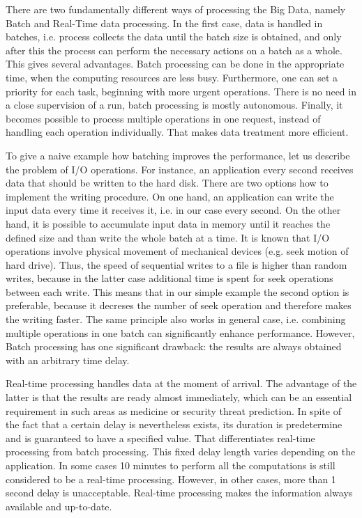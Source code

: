 There are two fundamentally different ways of processing the Big Data, namely Batch and Real-Time data processing.
In the first case, data is handled in batches, i.e. process collects the data until the batch size is obtained, and only after this the process can perform the necessary actions on a batch as a whole.
This gives several advantages.
Batch processing can be done in the appropriate time, when the computing resources are less busy.
Furthermore, one can set a priority for each task, beginning with more urgent operations.
There is no need in a close supervision of a run, batch processing is mostly autonomous.
Finally, it becomes possible to process multiple operations in one request, instead of handling each operation individually.
That makes data treatment more efficient. 

To give a naive example how batching improves the performance, let us describe the problem of I/O operations.
For instance, an application every second receives data that should be written to the hard disk. 
There are two options how to implement the writing procedure.
On one hand, an application can write the input data every time it receives it, i.e. in our case every second.
On the other hand, it is possible to accumulate input data in memory until it reaches the defined size and than write the whole batch at a time.
It is known that I/O operations involve physical movement of mechanical devices (e.g. seek motion of hard drive).
Thus, the speed of sequential writes to a file is higher than random writes, because in the latter case additional time is spent for seek operations between each write.
This means that in our simple example the second option is preferable, because it decreses the number of seek operation and therefore makes the writing faster.    
The same principle also works in general case, i.e. combining multiple operations in one batch can significantly enhance performance.
However, Batch processing has one significant drawback: the results are always obtained with an arbitrary time delay.

Real-time processing handles data at the moment of arrival. 
The advantage of the latter is that the results are ready almost immediately, which can be an essential requirement in such areas as medicine or security threat prediction. 
In spite of the fact that a certain delay is nevertheless exists, its duration is predetermine and is guaranteed to have a specified value.
That differentiates real-time processing from batch processing.
This fixed delay length varies depending on the application.
In some cases 10 minutes to perform all the computations is still considered to be a real-time processing.
However, in other cases, more than 1 second delay is unacceptable.
Real-time processing makes the information always available and up-to-date.

